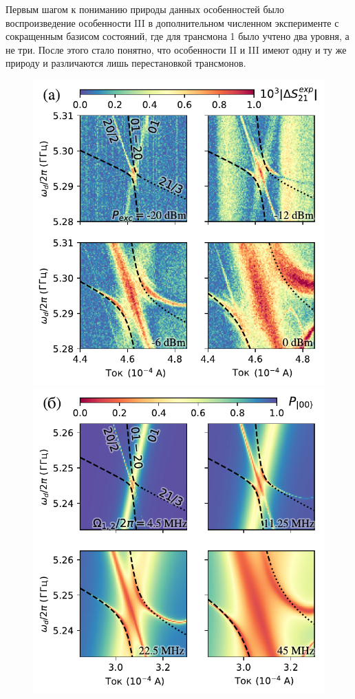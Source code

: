 \documentclass[14pt, a4paper]{extreport}
\numberwithin{equation}{section}
\begin{document}
Первым шагом к пониманию природы данных особенностей было воспроизведение особенности III в дополнительном численном эксперименте с сокращенным базисом состояний, где для трансмона 1 было учтено два уровня, а не три. После этого стало понятно, что особенности II и III имеют одну и ту же природу и различаются лишь перестановкой трансмонов.

\begin{figure}
	\includegraphics[width=.49\linewidth]{powerscan}
	\includegraphics[width=.49\linewidth]{zoom2_picture}
	

\end{figure}
\end{document}
